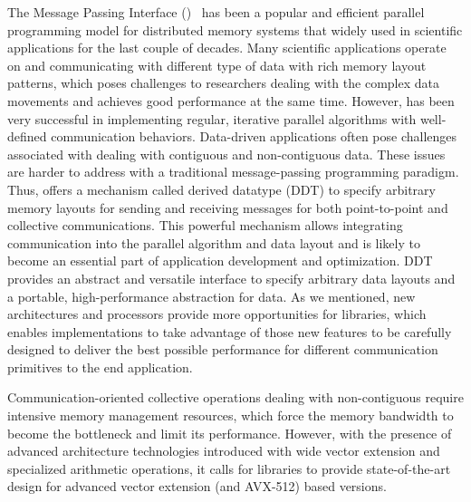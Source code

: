 \documentclass[conference]{IEEEtran}
\begin{document}
The Message Passing Interface (\mpi)~\cite{mpi-forum} has been a popular
and efficient parallel programming model for distributed memory systems
that widely used in scientific applications for the last couple of decades.
Many scientific applications operate on and communicating with different type of data with rich memory layout patterns,
which poses challenges to researchers dealing with the complex data movements and achieves good performance at the same time.
However, \mpi has been very successful in implementing regular, iterative parallel algorithms with well-defined communication
behaviors. Data-driven applications often pose challenges associated with dealing
with contiguous and non-contiguous data.
These issues are harder to address with a traditional message-passing programming paradigm.
Thus, \mpi offers a mechanism called derived datatype (DDT) to specify arbitrary memory layouts
for sending and receiving messages for both point-to-point and collective communications. This powerful mechanism allows integrating communication into the parallel algorithm and data layout and is likely to become an essential part of application development and optimization.
DDT provides an abstract and versatile interface to specify arbitrary data layouts and a portable, high-performance abstraction for data. As we mentioned, new architectures and processors provide more opportunities for \mpi libraries, which enables \mpi implementations to take advantage of those new features to be carefully designed to deliver the best possible performance for different communication primitives to the end application.

Communication-oriented collective operations dealing with non-contiguous
require intensive memory management resources, which force
the memory bandwidth to become the bottleneck and limit its performance.
However, with the presence of advanced architecture technologies introduced
with wide vector extension and specialized arithmetic operations, it calls for
\mpi libraries to provide state-of-the-art design for advanced vector extension (\sve and AVX-512) based versions.
\end{document}
